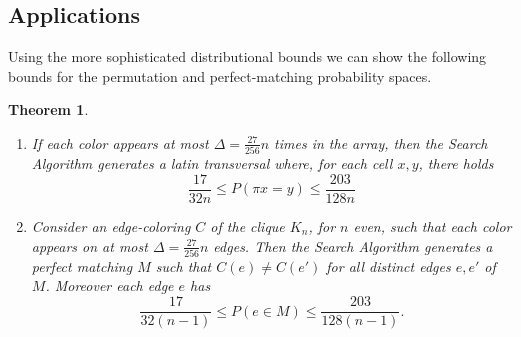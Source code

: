 \documentclass[11pt]{article}
\newtheorem{theorem}{Theorem}[section]
\begin{document}
\subsection{Applications}  Using the more sophisticated distributional bounds we can show the following bounds for the permutation and perfect-matching probability spaces.
\begin{theorem}
\label{perm-cor1}
\begin{enumerate}
\item If each color appears at most $\Delta = \frac{27}{256} n$ times in the array, then the Search Algorithm generates a latin transversal where, for each cell $x,y$, there holds
$$
\frac{17}{32 n} \leq P( \pi x = y ) \leq \frac{203}{128 n}
$$
\item Consider an edge-coloring $C$ of the clique $K_n$, for $n$ even, such that each color appears on at most $\Delta = \frac{27}{256} n$ edges. Then the Search Algorithm generates a perfect matching $M$ such that $C(e) \neq C(e')$  for all distinct edges $e, e'$ of $M$.  Moreover each edge $e$ has
$$
\frac{17}{32 (n-1)} \leq P( e \in M) \leq \frac{203}{128(n-1)}.
$$
\end{enumerate}
\end{theorem}
\end{document}
